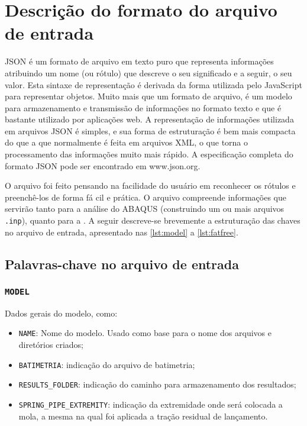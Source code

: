 \apendices
\renewcommand{\apendicesname}{AP\^ENDICES}
\partpage

\chapter{Descrição do formato do arquivo de entrada\label{apendice:json}}

JSON é um formato de arquivo em texto puro que representa informações atribuindo um nome (ou rótulo) que descreve o seu significado e a seguir, o seu valor. Esta sintaxe de representação é derivada da forma utilizada pelo JavaScript para representar objetos. Muito mais que um formato de arquivo, é um modelo para armazenamento e transmissão de informações no formato texto e que é bastante utilizado por aplicações web. A representação de informações utilizada em arquivos JSON é simples, e sua forma de estruturação é bem mais compacta do que a que normalmente é feita em arquivos XML, o que torna o processamento das informações muito mais rápido. A especificação completa do formato JSON pode ser encontrado em www.json.org.

O arquivo foi feito pensando na facilidade do usuário em reconhecer os rótulos e preenchê-los de forma fá\newline
cil e prática.
O arquivo compreende informações que servirão tanto para a análise do ABAQUS (construindo um ou mais arquivos \texttt{.inp}), quanto para a \fatfree.
A seguir descreve-se brevemente a estruturação das chaves no arquivo de entrada, apresentado nas \autoref{lst:model} a \autoref{lst:fatfree}.

\section*{Palavras-chave no arquivo de entrada}

\subsection{\texttt{MODEL}}

Dados gerais do modelo, como:

\begin{itemize}
  \item \texttt{NAME}: Nome do modelo. Usado como base para o nome dos arquivos e diretórios criados;
  \item \texttt{BATIMETRIA}: indicação do arquivo de batimetria;
  \item \texttt{RESULTS\_FOLDER}: indicação do caminho para armazenamento dos resultados;
  \item \texttt{SPRING\_PIPE\_EXTREMITY}: indicação da extremidade onde será colocada a mola, a mesma na qual foi aplicada a tração residual de lançamento.
\end{itemize}

